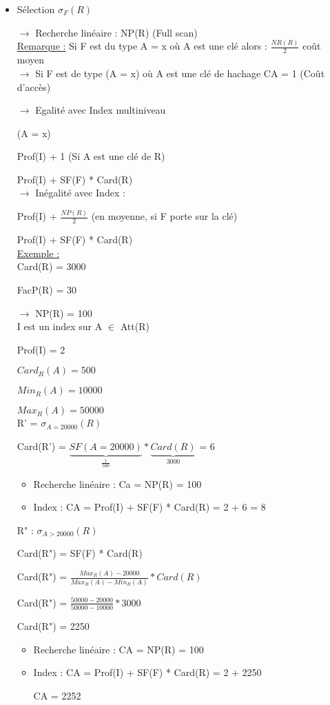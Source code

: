 \documentclass{article}
\begin{document}
\begin{itemize}\renewcommand{\labelitemi}{$\bullet$}
	\item  Sélection $\sigma_{F}(R)$

$\rightarrow$ Recherche linéaire : NP(R)  (Full scan)\\

\underline{Remarque :} Si F est du type A = x où A est une clé alors : $\frac{NR(R)}{2}$ coût moyen\\

$\rightarrow$ Si F est de type (A = x) où A est une clé de hachage CA = 1 (Coût d'accès)

$\rightarrow$ Egalité avec Index multiniveau

(A = x)

Prof(I) + 1 (Si A est une clé de R)

Prof(I) + SF(F) * Card(R)\\

$\rightarrow$ Inégalité avec Index :

Prof(I) + $\frac{NP(R)}{2}$ (en moyenne, si F porte sur la clé)

Prof(I) + SF(F) * Card(R)\\

\underline{Exemple :}\\

Card(R) = 3000

FacP(R) = 30

$\rightarrow$ NP(R) = 100\\

I est un index sur A $\in$ Att(R)

Prof(I) = 2

$Card_{R}(A) = 500$

$Min_{R}(A) = 10 000$

$Max_{R}(A) = 50 000$\\

R' = $\sigma_{A=20000}(R)$

Card(R') = $\underbrace{SF(A=20000)}_{\frac{1}{500}} *\underbrace{Card(R)}_{3000}$ = 6

\begin{itemize}
	\item Recherche linéaire : Ca = NP(R) = 100
	\item Index : CA = Prof(I) + SF(F) * Card(R) = 2 + 6 = 8
\end{itemize}

R" : $\sigma_{A > 20000}(R)$

Card(R") = SF(F) * Card(R)

Card(R") = $\frac{Max_{R}(A) - 20000}{Max_{R}(A)-Min_{R}(A)} * Card(R)$

Card(R") = $\frac{50000-20000}{50000-10000}*3000$

Card(R") = 2250

\begin{itemize}
	\item Recherche linéaire : CA = NP(R) = 100
	\item Index : CA = Prof(I) + SF(F) * Card(R) = 2 + 2250 

CA = 2252
\end{itemize}

\end{itemize}
\end{document}
